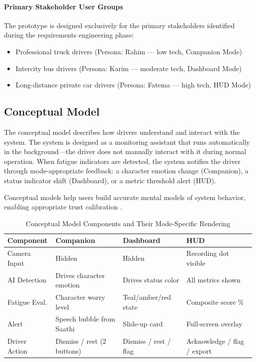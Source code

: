 \documentclass[sigconf]{acmart}
\begin{document}
\paragraph{Primary Stakeholder User Groups}
The prototype is designed exclusively for the primary stakeholders identified during the requirements engineering phase:
\begin{itemize}
    \item Professional truck drivers (Persona: Rahim --- low tech, Companion Mode)
    \item Intercity bus drivers (Persona: Karim --- moderate tech, Dashboard Mode)
    \item Long-distance private car drivers (Persona: Fatema --- high tech, HUD Mode)
\end{itemize}

\subsection{Conceptual Model}

The conceptual model describes how drivers understand and interact with the system. The system is designed as a monitoring assistant that runs automatically in the background---the driver does not manually interact with it during normal operation. When fatigue indicators are detected, the system notifies the driver through mode-appropriate feedback: a character emotion change (Companion), a status indicator shift (Dashboard), or a metric threshold alert (HUD).

Conceptual models help users build accurate mental models of system behavior, enabling appropriate trust calibration \cite{ref12, ref13}.

\begin{table}[h]
\centering
\caption{Conceptual Model Components and Their Mode-Specific Rendering}
\small
\begin{tabular}{|p{1.5cm}|p{2cm}|p{1.7cm}|p{1.7cm}|}
\hline
\textbf{Component} & \textbf{Companion} & \textbf{Dashboard} & \textbf{HUD} \\
\hline
Camera Input & Hidden & Hidden & Recording dot visible \\
\hline
AI Detection & Drives character emotion & Drives status color & All metrics shown \\
\hline
Fatigue Eval. & Character worry level & Teal/amber/red state & Composite score \% \\
\hline
Alert & Speech bubble from Saathi & Slide-up card & Full-screen overlay \\
\hline
Driver Action & Dismiss / rest (2 buttons) & Dismiss / rest / flag & Acknowledge / flag / export \\
\hline
\end{tabular}
\end{table}
\end{document}
